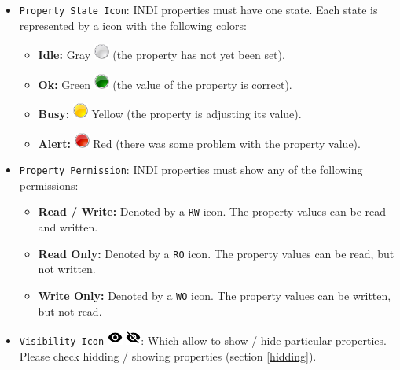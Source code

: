 \begin{itemize}
  \item \texttt{Property State Icon}: INDI properties must have one state. Each state is represented by a icon with the following colors: 
    \begin{itemize}
      \item \textbf{Idle:} Gray \includegraphics[width=0.5cm]{../images/grey_light_32.png} (the property has not yet been set).
      \item \textbf{Ok:} Green \includegraphics[width=0.5cm]{../images/green_light_32.png} (the value of the property is correct).
      \item \textbf{Busy:} \includegraphics[width=0.5cm]{../images/yellow_light_32.png} Yellow (the property is adjusting its value).
      \item \textbf{Alert:} \includegraphics[width=0.5cm]{../images/red_light_32.png} Red (there was some problem with the property value).
    \end{itemize}
  
  
  \item \texttt{Property Permission}: INDI properties must show any of the following permissions:
    \begin{itemize}
      \item \textbf{Read / Write:} Denoted by a \texttt{RW} icon. The property values can be read and written.
      \item \textbf{Read Only:} Denoted by a \texttt{RO} icon. The property values can be read, but not written.
      \item \textbf{Write Only:} Denoted by a \texttt{WO} icon. The property values can be written, but not read.
    \end{itemize}
  
  
  \item \texttt{Visibility Icon} \includegraphics[width=0.5cm]{../images/visibility1.png} \includegraphics[width=0.5cm]{../images/visibility2.png}: Which allow to show / hide particular properties. Please check hidding / showing properties (section \ref{hidding}).
\end{itemize}


